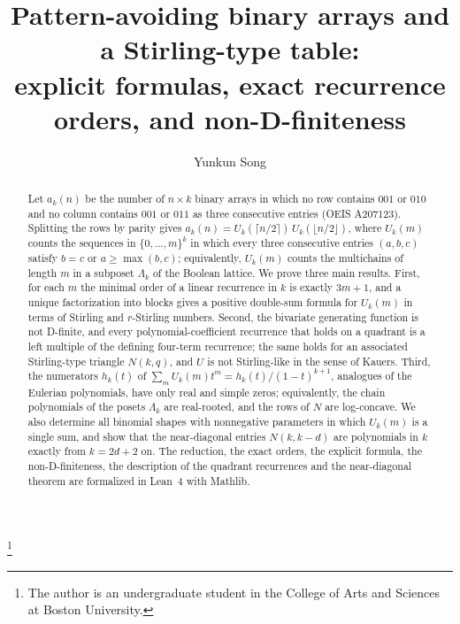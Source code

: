 \documentclass[11pt]{amsart}
\theoremstyle{definition}
\begin{document}
\title[Pattern-avoiding binary arrays and a Stirling-type table]{Pattern-avoiding binary arrays and a Stirling-type table:\\ explicit formulas, exact recurrence orders, and non-D-finiteness}

\author{Yunkun Song}
\address{College of Arts and Sciences, Boston University, Boston, MA 02215, USA}
\thanks{The author is an undergraduate student in the College of Arts and Sciences at Boston University.}

\begin{abstract}
Let $a_k(n)$ be the number of $n\times k$ binary arrays in which no row contains $001$ or $010$ and no column contains $001$ or $011$ as three consecutive entries (OEIS A207123). Splitting the rows by parity gives $a_k(n)=U_k(\lceil n/2\rceil)\,U_k(\lfloor n/2\rfloor)$, where $U_k(m)$ counts the sequences in $\{0,\dots,m\}^k$ in which every three consecutive entries $(a,b,c)$ satisfy $b=c$ or $a\ge\max(b,c)$; equivalently, $U_k(m)$ counts the multichains of length $m$ in a subposet $\Lambda_k$ of the Boolean lattice. We prove three main results. First, for each $m$ the minimal order of a linear recurrence in $k$ is exactly $3m+1$, and a unique factorization into blocks gives a positive double-sum formula for $U_k(m)$ in terms of Stirling and $r$-Stirling numbers. Second, the bivariate generating function is not D-finite, and every polynomial-coefficient recurrence that holds on a quadrant is a left multiple of the defining four-term recurrence; the same holds for an associated Stirling-type triangle $N(k,q)$, and $U$ is not Stirling-like in the sense of Kauers. Third, the numerators $h_k(t)$ of $\sum_mU_k(m)t^m=h_k(t)/(1-t)^{k+1}$, analogues of the Eulerian polynomials, have only real and simple zeros; equivalently, the chain polynomials of the posets $\Lambda_k$ are real-rooted, and the rows of $N$ are log-concave. We also determine all binomial shapes with nonnegative parameters in which $U_k(m)$ is a single sum, and show that the near-diagonal entries $N(k,k-d)$ are polynomials in $k$ exactly from $k=2d+2$ on. The reduction, the exact orders, the explicit formula, the non-D-finiteness, the description of the quadrant recurrences and the near-diagonal theorem are formalized in Lean~4 with Mathlib.
\end{abstract}

\end{document}
